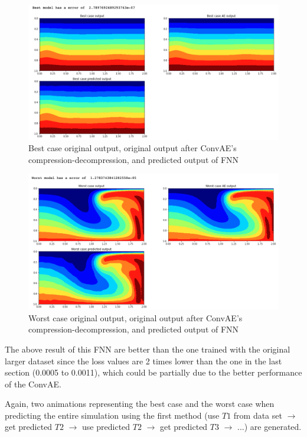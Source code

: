 \begin{figure}[H]
    \caption{Best case original output, original output after ConvAE's compression-decompression, and predicted output of FNN}
    \includegraphics[scale=0.5]{Report LaTeX/figures/mantle_convection_images/larger_dataset_interpolated/FNN_Best.png}
\end{figure}

\begin{figure}[H]
    \caption{Worst case original output, original output after ConvAE's compression-decompression, and predicted output of FNN}
    \includegraphics[scale=0.5]{Report LaTeX/figures/mantle_convection_images/larger_dataset_interpolated/FNN_Worst.png}
\end{figure}

The above result of this FNN are better than the one trained with the original larger dataset since the loss values are 2 times lower than the one in the last section (0.0005 to 0.0011), which could be partially due to the better performance of the ConvAE.

Again, two animations representing the best case and the worst case when predicting the entire simulation using the first method (use $T1$ from data set $\rightarrow$ get predicted $T2$ $\rightarrow$ use predicted $T2$ $\rightarrow$ get predicted $T3$ $\rightarrow$ ...) are generated.

